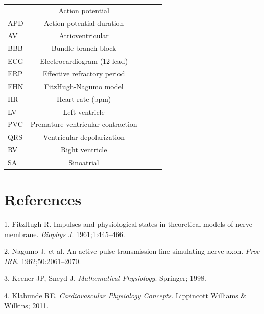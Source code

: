 \documentclass[12pt]{book}
\begin{document}
\begin{tabular}{|l|c|c|c|c|}
\begin{tabular}{|l|c|l|}
\begin{tabular}{|l|X|}
\hline
AP & Action potential \\
APD & Action potential duration \\
AV & Atrioventricular \\
BBB & Bundle branch block \\
ECG & Electrocardiogram (12-lead) \\
ERP & Effective refractory period \\
FHN & FitzHugh-Nagumo model \\
HR & Heart rate (bpm) \\
LV & Left ventricle \\
PVC & Premature ventricular contraction \\
QRS & Ventricular depolarization \\
RV & Right ventricle \\
SA & Sinoatrial \\
\hline
\end{tabular}

\section{References}

1. FitzHugh R. Impulses and physiological states in theoretical models of nerve membrane. \textit{Biophys J}. 1961;1:445--466.

2. Nagumo J, et al. An active pulse transmission line simulating nerve axon. \textit{Proc IRE}. 1962;50:2061--2070.

3. Keener JP, Sneyd J. \textit{Mathematical Physiology}. Springer; 1998.

4. Klabunde RE. \textit{Cardiovascular Physiology Concepts}. Lippincott Williams \& Wilkins; 2011.
\end{document}
